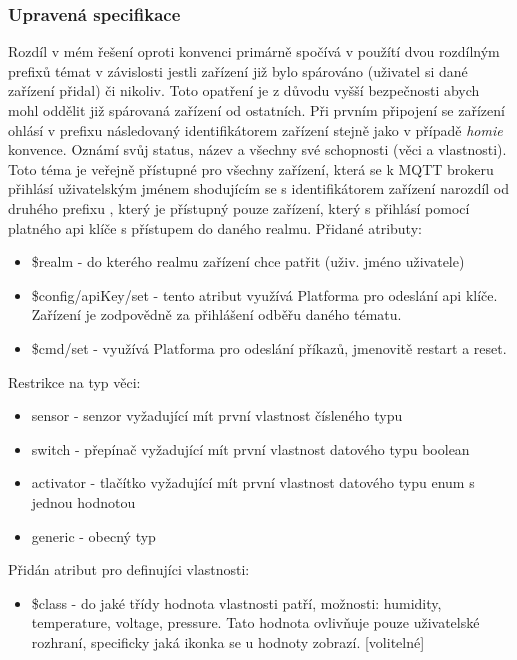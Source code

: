 \subsubsection{Upravená specifikace}
Rozdíl v mém řešení oproti  konvenci primárně spočívá v použítí dvou rozdílným prefixů témat v závislosti jestli zařízení již bylo spárováno (uživatel si dané zařízení přidal) či nikoliv. Toto opatření je z důvodu vyšší bezpečnosti abych mohl oddělit již spárovaná zařízení od ostatních. Při prvním připojení se zařízení ohlásí v prefixu  následovaný identifikátorem zařízení stejně jako v případě \textit{homie} konvence. Oznámí svůj status, název a všechny své schopnosti (věci a vlastnosti). Toto téma je veřejně přístupné pro všechny zařízení, která se k MQTT brokeru přihlásí uživatelským jménem shodujícím se s identifikátorem zařízení narozdíl od druhého prefixu , který je přístupný pouze zařízení, který s přihlásí pomocí platného api klíče s přístupem do daného realmu. Přidané atributy:
\begin{itemize}
    \item \$realm - do kterého realmu zařízení chce patřit (uživ. jméno uživatele)
    \item \$config/apiKey/set - tento atribut využívá Platforma pro odeslání api klíče. Zařízení je zodpovědně za přihlášení odběřu daného tématu.
    \item \$cmd/set - využívá Platforma pro odeslání příkazů, jmenovitě restart a reset.
\end{itemize}

Restrikce na typ věci:
\begin{itemize}
    \item sensor - senzor vyžadující mít první vlastnost čísleného typu
    \item switch - přepínač vyžadující mít první vlastnost datového typu boolean
    \item activator - tlačítko vyžadující mít první vlastnost datového typu enum s jednou hodnotou
    \item generic - obecný typ
\end{itemize}

Přidán atribut pro definujíci vlastnosti:
\begin{itemize}
    \item \$class - do jaké třídy hodnota vlastnosti patří, možnosti: humidity, temperature, voltage, pressure. Tato hodnota ovlivňuje pouze uživatelské rozhraní, specificky jaká ikonka se u hodnoty zobrazí. [volitelné]
\end{itemize}


